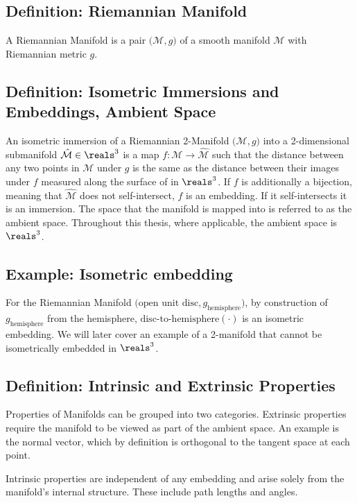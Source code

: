 \subsection{ Definition: Riemannian Manifold}
A Riemannian Manifold is a pair $\big(\mathcal{M}, g\big)$ of a smooth manifold $\mathcal{M}$ with Riemannian metric $g$.

\subsection{ Definition: Isometric Immersions and Embeddings, Ambient Space}
An isometric immersion of a Riemannian 2-Manifold $\big(\mathcal{M}, g\big)$ into a 2-dimensional submanifold $\hat{\mathcal{M}} \in \reals^3$ is a map $f: \mathcal{M} \to \hat{\mathcal{M}}$ such that the distance between any two points in $\mathcal{M}$ under $g$ is the same as the distance between their images under $f$ measured along the surface of in $\reals^3$. If $f$ is additionally a bijection, meaning that $\hat{\mathcal{M}}$ does not self-intersect, $f$ is an embedding. If it self-intersects it is an immersion. The space that the manifold is mapped into is referred to as the ambient space. Throughout this thesis, where applicable, the ambient space is $\reals^3$.

\subsection{ Example: Isometric embedding}
For the Riemannian Manifold $\big(\text{open unit disc}, g_{\text{hemisphere}}\big)$, by construction of $g_{\text{hemisphere}}$ from the hemisphere, $\text{disc-to-hemisphere}(\cdot)$ is an isometric embedding. 
We will later cover an example of a 2-manifold that cannot be isometrically embedded in $\reals^3$.

\subsection{ Definition: Intrinsic and Extrinsic Properties}

Properties of Manifolds can be grouped into two categories. Extrinsic properties require the manifold to be viewed as part of the ambient space. An example is the normal vector, which by definition is orthogonal to the tangent space at each point. 

Intrinsic properties are independent of any embedding and arise solely from the manifold's internal structure. These include path lengths and angles.

